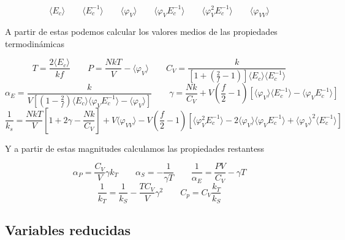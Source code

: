 \documentclass[11pt]{article} %
\newcommand{\parentesis}[1]{\left( #1  \right)}
\newcommand{\ccorchetes}[1]{\left[ #1  \right]}
\newcommand{\dquad}{\quad \quad}
\newcommand{\Ec}{\langle E_c \rangle}
\newcommand{\Ecinv}{\langle E_c^{-1} \rangle}
\newcommand{\varphiV}{\langle \varphi_V \rangle}
\newcommand{\varphiVV}{\langle \varphi_{VV}\rangle}
\newcommand{\varphiVEcinv}{\langle \varphi_V E_c^{-1} \rangle}
\newcommand{\varphiVVEcinv}{ \langle \varphi_V^2 E_c^{-1} \rangle}
\begin{document}
\begin{mybox}
	\begin{equation}
		\langle E_c \rangle \dquad \langle E_c^{-1} \rangle  \dquad \langle \varphi_V \rangle  \dquad \langle \varphi_V E_c^{-1} \rangle \dquad \langle \varphi_V^2 E_c^{-1} \rangle \dquad \langle \varphi_{VV}\rangle \label{Ec:02-01-30}
	\end{equation}
\end{mybox}	
A partir de estas podemos calcular los valores medios de las propiedades termodinámicas

\begin{mybox}
\begin{equation}
	 T = \frac{2\Ec}{kf} \dquad P = \frac{NkT}{V} - \langle \varphi_V \rangle \dquad C_V = \frac{k}{\ccorchetes{1+\parentesis{\frac{2}{f}-1}}\Ec \Ecinv}   \label{Ec:02-01-31}
\end{equation}
\begin{equation*}
\alpha_E  = \frac{k}{V\ccorchetes{\parentesis{1-\frac{2}{f}}\Ec \varphiVEcinv - \varphiV }} \dquad
	\gamma  = \frac{Nk}{C_V} + V \parentesis{\frac{f}{2} -1} \ccorchetes{\varphiV \Ecinv - \varphiVEcinv}  
\end{equation*}
\begin{equation*}
	\frac{1}{k_s} = \frac{NkT}{V} \ccorchetes{1+2\gamma - \frac{Nk}{C_V}} + V \varphiVV  - V\parentesis{\frac{f}{2} -1} \ccorchetes{\varphiVVEcinv - 2 \varphiV \varphiVEcinv + \varphiV^2 \Ecinv}
\end{equation*}
\end{mybox}	
Y a partir de estas magnitudes calculamos las propiedades restantess

\begin{mybox}
	\begin{equation}
		\alpha_P = \frac{C_V}{V} \gamma k_T \dquad \alpha_S = - \frac{1}{\gamma T} \dquad \frac{1}{\alpha_E} = \frac{PV}{C_V} - \gamma T \label{Ec:02-01-32}
	\end{equation}
	\begin{equation*}
		\frac{1}{k_T} = \frac{1}{k_S} - \frac{TC_V}{V} \gamma^2 \dquad C_p = C_V \frac{k_T}{k_S}
	\end{equation*}
\end{mybox}

\subsection{Variables reducidas}
\end{document}
